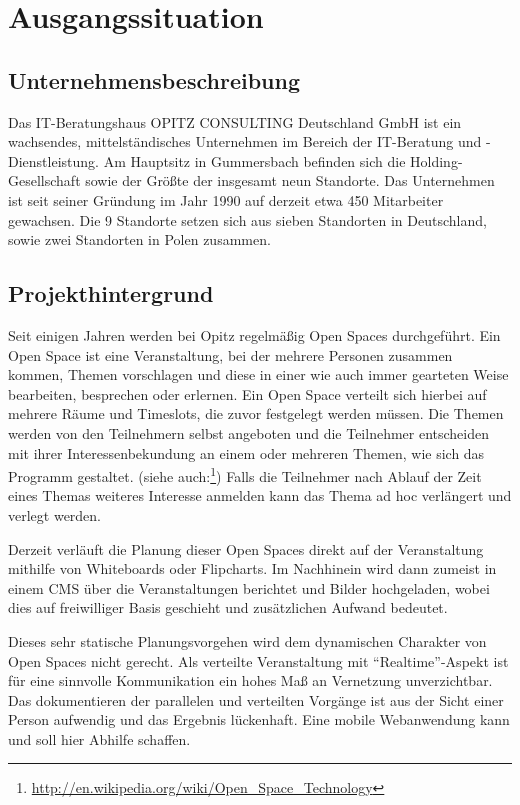 \documentclass[12pt,a4paper]{scrartcl}
\begin{document}
\section{Ausgangssituation}
\subsection{Unternehmensbeschreibung}
Das IT-Beratungshaus OPITZ CONSULTING Deutschland GmbH ist ein wachsendes, mittelständisches Unternehmen im Bereich der IT-Beratung und -Dienstleistung. Am Hauptsitz in Gummersbach befinden sich die Holding-Gesellschaft sowie der Größte der insgesamt neun Standorte. Das Unternehmen ist seit seiner Gründung im Jahr 1990 auf derzeit etwa 450 Mitarbeiter gewachsen. Die 9 Standorte setzen sich aus sieben Standorten in Deutschland, sowie zwei Standorten in Polen zusammen.
\subsection{Projekthintergrund}
Seit einigen Jahren werden bei Opitz regelmäßig Open Spaces durchgeführt.
Ein Open Space ist eine Veranstaltung, bei der mehrere Personen zusammen kommen, Themen vorschlagen und diese in einer wie auch immer gearteten Weise bearbeiten, besprechen oder erlernen. Ein Open Space verteilt sich hierbei auf mehrere Räume und Timeslots, die zuvor festgelegt werden müssen. Die Themen werden von den Teilnehmern selbst angeboten und die Teilnehmer entscheiden mit ihrer Interessenbekundung an einem oder mehreren Themen, wie sich das Programm gestaltet.
(siehe auch:\footnote{\url{http://en.wikipedia.org/wiki/Open_Space_Technology}})
Falls die Teilnehmer nach Ablauf der Zeit eines Themas weiteres Interesse anmelden kann das Thema ad hoc verlängert und verlegt werden.

\noindent Derzeit verläuft die Planung dieser Open Spaces direkt auf der Veranstaltung mithilfe von Whiteboards oder Flipcharts. Im Nachhinein wird dann zumeist in einem CMS über die Veranstaltungen berichtet und Bilder hochgeladen, wobei dies auf freiwilliger Basis geschieht und zusätzlichen Aufwand bedeutet.

\noindent Dieses sehr statische Planungsvorgehen wird dem dynamischen Charakter von Open Spaces nicht gerecht. Als verteilte Veranstaltung mit ``Realtime''-Aspekt ist für eine sinnvolle Kommunikation ein hohes Maß an Vernetzung unverzichtbar. Das dokumentieren der parallelen und verteilten Vorgänge ist aus der Sicht einer Person aufwendig und das Ergebnis lückenhaft. Eine mobile Webanwendung kann und soll hier Abhilfe schaffen.
\end{document}
